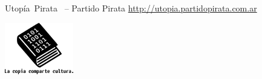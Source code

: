     \newpage
    \thispagestyle{empty}

    \begin{flushleft}\hbox{\Large{Utopía Pirata}}
    \copyleft \, \the\year -- Partido Pirata
    \url{http://utopia.partidopirata.com.ar}

    \vfill

    \centering
    \includegraphics[width=3cm]{assets/images/la_copia_comparte_cultura.png}

    \end{flushleft}
   \newpage

